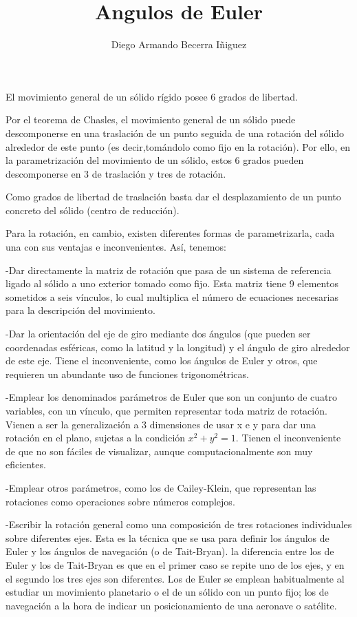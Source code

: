 \documentclass[12pt,a4paper]{report}
\author{Diego Armando Becerra Iñiguez}
\title{Angulos de Euler}
\begin{document}
\maketitle
El movimiento general de un sólido rígido posee 6 grados de libertad.

Por el teorema de Chasles, el movimiento general de un sólido puede descomponerse en una traslación de un punto seguida de una rotación del sólido alrededor de este punto (es decir,tomándolo como fijo en la rotación). Por ello, en la parametrización del movimiento de un sólido, estos 6 grados pueden descomponerse en 3 de traslación y tres de rotación.

Como grados de libertad de traslación basta dar el desplazamiento de un punto concreto del sólido (centro de reducción).

Para la rotación, en cambio, existen diferentes formas de parametrizarla, cada una con sus ventajas e inconvenientes. Así, tenemos:

-Dar directamente la matriz de rotación que pasa de un sistema de referencia ligado al sólido a uno exterior tomado como fijo. Esta matriz tiene 9 elementos sometidos a seis vínculos, lo cual multiplica el número de ecuaciones necesarias para la descripción del movimiento.

-Dar la orientación del eje de giro mediante dos ángulos (que pueden ser coordenadas esféricas, como la latitud y la longitud) y el ángulo de giro alrededor de este eje. Tiene el inconveniente, como los ángulos de Euler y otros, que requieren un abundante uso de funciones trigonométricas.

-Emplear los denominados parámetros de Euler que son un conjunto de cuatro variables, con un vínculo, que permiten representar toda matriz de rotación. Vienen a ser la generalización a 3 dimensiones de usar x e y para dar una rotación en el plano, sujetas a la condición $x^{2}+y^{2}=1$. Tienen el inconveniente de que no son fáciles de visualizar, aunque computacionalmente son muy eficientes.

-Emplear otros parámetros, como los de Cailey-Klein, que representan las rotaciones como operaciones sobre números complejos.

-Escribir la rotación general como una composición de tres rotaciones individuales sobre diferentes ejes. Esta es la técnica que se usa para definir los ángulos de Euler y los ángulos de navegación (o de Tait-Bryan). la diferencia entre los de Euler y los de Tait-Bryan es que en el primer caso se repite uno de los ejes, y en el segundo los tres ejes son diferentes. Los de Euler se emplean habitualmente al estudiar un movimiento planetario o el de un sólido con un punto fijo; los de navegación a la hora de indicar un posicionamiento de una aeronave o satélite.
\end{document}
